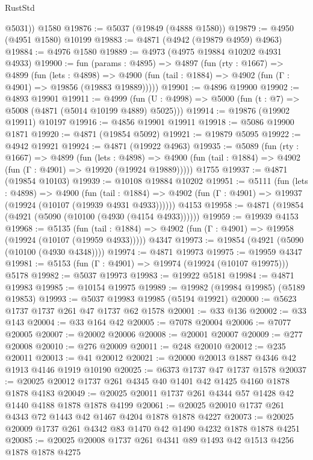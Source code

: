 \begin{lexlean}{RustStd}
\begin{coremodule}
{\begin{coremodule}
{{{{{{{{{{{{{{{{{{{{{{{{{{{{{        @5031))
    @1580
@19876 := @5037 (@19849 (@4888 @1580))
@19879 := @4950 (@4951 @1580) @10199
@19883 := @4871 (@4942 (@19879 @4959) @4963)
@19884 := @4976 @1580
@19889 := @4973 (@4975 @19884 @10202 @4931 @4933)
@19900 := fun (params : @4895) =>
  @4897
    (fun (rty : @1667) =>
    @4899
      (fun (lets : @4898) =>
      @4900 (fun (tail : @1884) => @4902 (fun (Γ : @4901) => @19856 (@19883 @19889)))))
@19901 := @4896 @19900
@19902 := @4893 @19901
@19911 := @4999
    (fun (U : @4998) => @5000 (fun (t : @7) => @5008 (@4871 (@5014 @10199 @4889) @5025)))
@19914 := @19876 (@19902 @19911) @10197
@19916 := @4856 @19901 @19911
@19918 := @5086 @19900 @1871
@19920 := @4871 (@19854 @5092)
@19921 := @19879 @5095
@19922 := @4942 @19921
@19924 := @4871 (@19922 @4963)
@19935 := @5089
    (fun (rty : @1667) =>
    @4899
      (fun (lets : @4898) =>
      @4900 (fun (tail : @1884) => @4902 (fun (Γ : @4901) => @19920 (@19924 @19889)))))
    @1755
@19937 := @4871 (@19854 @10103)
@19939 := @10108 @19884 @10202
@19951 := @5111
    (fun (lets : @4898) =>
    @4900
      (fun (tail : @1884) =>
      @4902 (fun (Γ : @4901) => @19937 (@19924 (@10107 (@19939 @4931 @4933))))))
    @4153
@19958 := @4871 (@19854 (@4921 (@5090 (@10100 (@4930 (@4154 @4933))))))
@19959 := @19939 @4153
@19968 := @5135
    (fun (tail : @1884) => @4902 (fun (Γ : @4901) => @19958 (@19924 (@10107 (@19959 @4933)))))
    @4347
@19973 := @19854 (@4921 (@5090 (@10100 (@4930 @4348))))
@19974 := @4871 @19973
@19975 := @19959 @4347
@19981 := @5153 (fun (Γ : @4901) => @19974 (@19924 (@10107 @19975))) @5178
@19982 := @5037 @19973
@19983 := @19922 @5181
@19984 := @4871 @19983
@19985 := @10154 @19975
@19989 := @19982 (@19984 @19985) (@5189 @19853)
@19993 := @5037 @19983 @19985 (@5194 @19921)
@20000 := @5623 @1737 @1737 @261 @47 @1737 @62 @1578
@20001 := @33 @136
@20002 := @33 @143
@20004 := @33 @164 @42
@20005 := @7078 @20004
@20006 := @7077 @20005
@20007 := @20002 @20006
@20008 := @20001 @20007
@20009 := @277 @20008
@20010 := @276 @20009
@20011 := @248 @20010
@20012 := @235 @20011
@20013 := @41 @20012
@20021 := @20000 @20013 @1887 @4346 @42 @1913 @4146 @1919 @10190
@20025 := @6373 @1737 @47 @1737 @1578
@20037 := @20025 @20012 @1737 @261 @4345 @40 @1401 @42 @1425 @4160 @1878 @1878 @4183
@20049 := @20025 @20011 @1737 @261 @4344 @57 @1428 @42 @1440 @4188 @1878 @1878 @4199
@20061 := @20025 @20010 @1737 @261 @4343 @72 @1443 @42 @1467 @4204 @1878 @1878 @4227
@20073 := @20025 @20009 @1737 @261 @4342 @83 @1470 @42 @1490 @4232 @1878 @1878 @4251
@20085 := @20025 @20008 @1737 @261 @4341 @89 @1493 @42 @1513 @4256 @1878 @1878 @4275
}}}}}}}}}}}}}}}}}}}}}}}}}}}}}
\end{coremodule}}
\end{coremodule}
\end{lexlean}
